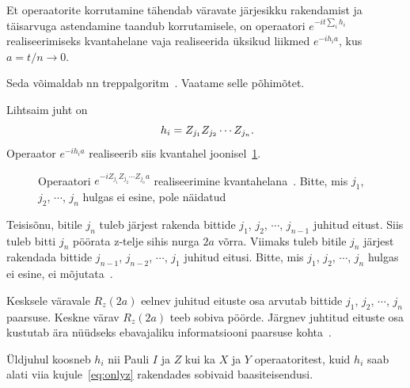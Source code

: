 \documentclass[12pt]{report}
\begin{document}
Et operaatorite korrutamine tähendab väravate järjesikku rakendamist ja täisarvuga astendamine taandub korrutamisele, on operaatori \(e^{-i t \sum_i h_i}\) realiseerimiseks kvantahelane vaja realiseerida üksikud liikmed \(e^{-i h_i a}\), kus \(a = t /n \rightarrow 0\).

Seda võimaldab nn treppalgoritm~\cite{mansky+etal}.
Vaatame selle põhimõtet.

Lihtsaim juht on
\begin{equation}\label{eq:onlyz}
  h_i = Z_{j_1}Z_{j_2}\cdots Z_{j_n} \rlap{.}
\end{equation}
Operaator \(e^{-i h_i a}\) realiseerib siis kvantahel joonisel~\ref{f:expz}.

\begin{figure}[h]
  \centering
  \ifdefined\yquanton
  \fi
  \caption{Operaatori \(e^{-iZ_{j_1}Z_{j_2}\cdots Z_{j_n}a}\) realiseerimine kvantahelana~\cite{mansky+etal, nielsen+chuang}. Bitte, mis \(j_1\), \(j_2\), \(\cdots\), \(j_n\) hulgas ei esine, pole näidatud}
  \label{f:expz}
\end{figure}

Teisisõnu, bitile \(j_n\) tuleb järjest rakenda bittide \(j_1\), \(j_2\), \(\cdots\), \(j_{n-1}\) juhitud eitust.
Siis tuleb bitti \(j_n\) pöörata z-telje sihis nurga \(2a\) võrra.
Viimaks tuleb bitile \(j_n\) järjest rakendada bittide \(j_{n-1}\), \(j_{n-2}\), \(\cdots\), \(j_1\) juhitud eitusi.
Bitte, mis \(j_1\), \(j_2\), \(\cdots\), \(j_n\) hulgas ei esine, ei mõjutata~\cite{mansky+etal}.

Kesksele väravale \(R_z(2a)\) eelnev juhitud eituste osa arvutab bittide \(j_1\), \(j_2\), \(\cdots\), \(j_n\) paarsuse.
Keskne värav \(R_z(2a)\) teeb sobiva pöörde.
Järgnev juhtitud eituste osa kustutab ära nüüdseks ebavajaliku informatsiooni paarsuse kohta~\cite{nielsen+chuang}.

Üldjuhul koosneb \(h_i\) nii Pauli \(I\) ja \(Z\) kui ka \(X\) ja \(Y\) operaatoritest, kuid \(h_i\) saab alati viia kujule~\eqref{eq:onlyz} rakendades sobivaid baasiteisendusi.
\end{document}
